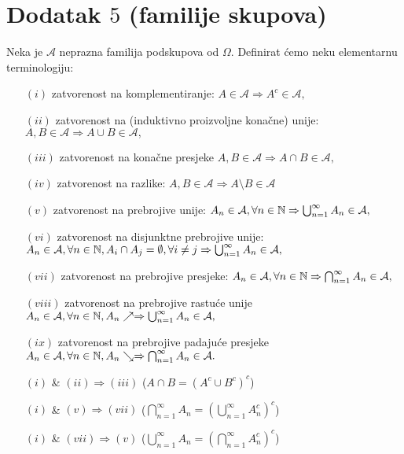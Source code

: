 \documentclass{article}
\begin{document}
\section{Dodatak \(5\) (familije skupova)}
Neka je \(\mathcal A\) neprazna familija podskupova od \(\Omega.\) Definirat ćemo neku elementarnu terminologiju:
\begin{enumerate}
    \item[\((i)\)] zatvorenost na komplementiranje: \(A\in\mathcal A\Rightarrow A^c\in\mathcal A,\)
    \item[\((ii)\)] zatvorenost na (induktivno proizvoljne konačne) unije: \(A,B\in\mathcal A\Rightarrow A\cup B\in\mathcal A,\) 
    \item[\((iii)\)] zatvorenost na konačne presjeke \(A,B\in\mathcal A\Rightarrow A\cap B\in\mathcal A,\) 
    \item[\((iv)\)] zatvorenost na razlike: \(A,B\in\mathcal A\Rightarrow A\setminus B\in\mathcal A\) 
    \item[\((v)\)] zatvorenost na prebrojive unije: \(A_n\in\mathcal A,\forall n\in\Bbb N\Rightarrow\bigcup_{n=1}^\infty A_n\in\mathcal A,\) 
    \item[\((vi)\)] zatvorenost na disjunktne prebrojive unije: \(A_n\in\mathcal A,\forall n\in\Bbb N, A_i\cap A_j=\emptyset,\forall i\ne j\Rightarrow\bigcup_{n=1}^\infty A_n\in\mathcal A,\) 
    \item[\((vii)\)] zatvorenost na prebrojive presjeke: \(A_n\in\mathcal A,\forall n\in\Bbb N\Rightarrow\bigcap_{n=1}^\infty A_n\in\mathcal A,\) 
    \item[\((viii)\)] zatvorenost na prebrojive rastuće unije \(A_n\in\mathcal A,\forall n\in\Bbb N,A_n\nearrow\Rightarrow\bigcup_{n=1}^\infty A_n\in\mathcal A,\) 
    \item[\((ix)\)] zatvorenost na prebrojive padajuće presjeke \(A_n\in\mathcal A,\forall n\in\Bbb N,A_n\searrow\Rightarrow\bigcap_{n=1}^\infty A_n\in\mathcal A.\)
\end{enumerate}
\begin{itemize}
    \item[\ding{228}] \((i)\) \& \((ii)\Rightarrow (iii)\) (\(A\cap B=(A^c\cup B^c)^c\))
    \item[\ding{228}] \((i)\) \& \((v)\Rightarrow (vii)\) (\(\bigcap_{n=1}^\infty A_n=\left(\bigcup_{n=1}^\infty A_n^c\right)^c\))
    \item[\ding{228}] \((i)\) \& \((vii)\Rightarrow (v)\) (\(\bigcup_{n=1}^\infty A_n=\left(\bigcap_{n=1}^\infty A_n^c\right)^c\))
 \end{itemize}
\end{document}
